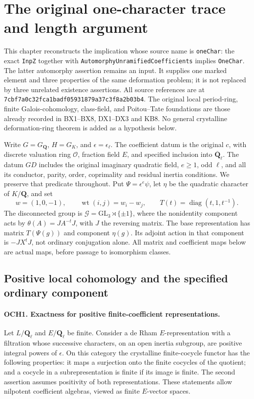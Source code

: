 \section{The original one-character trace and length argument}
\label{sec:one-character-v48}

This chapter reconstructs the implication whose source name is
\texttt{oneChar}: the exact \texttt{InpZ} together with
\texttt{AutomorphyUnramifiedCoefficients} implies \texttt{OneChar}.
The latter automorphy assertion remains an input.  It supplies one
marked element and three properties of the same deformation problem;
it is not replaced by three unrelated existence assertions.
All source references are at
\texttt{7cbf7a0c32fca1badf05931879a37c3f8a2b03b4}.
The original local period-ring, finite Galois-cohomology, class-field,
and Poitou--Tate foundations are those already recorded in BX1--BX8,
DX1--DX3 and KB8.  No general crystalline deformation-ring theorem is
added as a hypothesis below.

Write \(G=G_{\mathbf Q}\), \(H=G_K\), and
\(\epsilon=\epsilon_\ell\).  The coefficient datum is the original
\(c\), with discrete valuation ring \(\mathcal O\), fraction field
\(E\), and specified inclusion into
\(\overline{\mathbf Q}_\ell\).  The datum \(GD\) includes the
original imaginary quadratic field, \(e\ge1\), odd \(\ell\),
and all its conductor, parity, order, coprimality and residual
inertia conditions.  We preserve that predicate throughout.
Put \(\Psi=\epsilon^e\psi\), let \(\eta\) be the quadratic
character of \(K/\mathbf Q\), and set
\[
 w=(1,0,-1),\qquad \operatorname{wt}(i,j)=w_i-w_j,
 \qquad T(t)=\operatorname{diag}(t,1,t^{-1}).
 \tag{OCH.1}
\]
The disconnected group is
\(\mathcal G=\mathrm{GL}_3\rtimes\{\pm1\}\), where the
nonidentity component acts by
\(\theta(A)=J A^{-t}J\), with \(J\) the reversing matrix.
The base representation has matrix \(T(\Psi(g))\) and component
\(\eta(g)\).  Its adjoint action in that component is
\(-JX^tJ\), not ordinary conjugation alone.
All matrix and coefficient maps below are actual maps, before passage
to isomorphism classes.

\subsection{Positive local cohomology and the specified ordinary component}

\paragraph{OCH1. Exactness for positive finite-coefficient representations.}
\label{claim:OCH1}
Let \(L/\mathbf Q_\ell\) and \(E/\mathbf Q_\ell\) be finite.
Consider a de Rham \(E\)-representation with a filtration whose
successive characters, on an open inertia subgroup, are positive
integral powers of \(\epsilon\).  On this category the crystalline
finite-cocycle functor has the following properties: it maps a
surjection onto the finite cocycles of the quotient; and a cocycle
in a subrepresentation is finite if its image is finite.  The second
assertion assumes positivity of both representations.  These
statements allow nilpotent coefficient algebras, viewed as finite
\(E\)-vector spaces.

